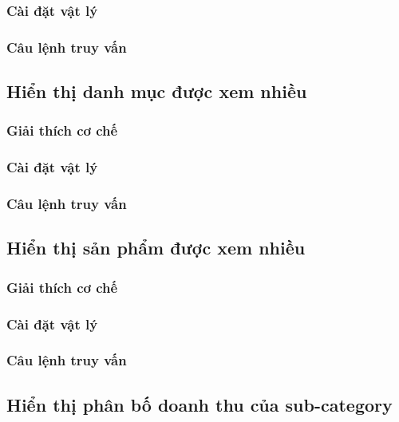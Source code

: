 \subsubsection{Cài đặt vật lý}

\subsubsection{Câu lệnh truy vấn}

\subsection{Hiển thị danh mục được xem nhiều}

\subsubsection{Giải thích cơ chế}

\subsubsection{Cài đặt vật lý}

\subsubsection{Câu lệnh truy vấn}

\subsection{Hiển thị sản phẩm được xem nhiều}

\subsubsection{Giải thích cơ chế}

\subsubsection{Cài đặt vật lý}

\subsubsection{Câu lệnh truy vấn}

\subsection{Hiển thị phân bố doanh thu của sub-category}

